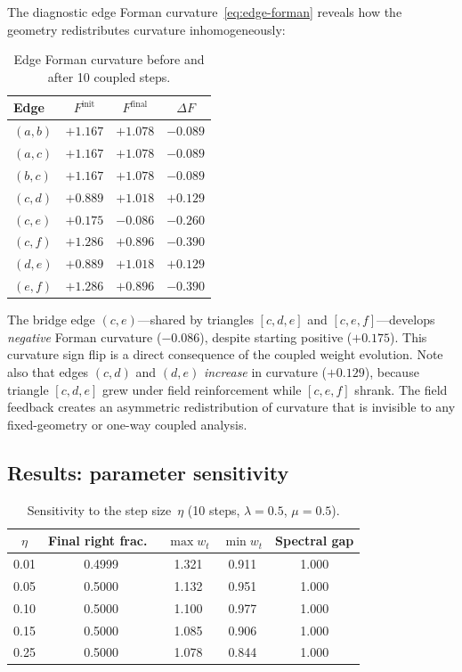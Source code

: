 \documentclass[11pt]{article}
\begin{document}
The diagnostic edge Forman curvature~\eqref{eq:edge-forman} reveals how the geometry redistributes curvature inhomogeneously:

\begin{table}[ht]
\centering
\small
\caption{Edge Forman curvature before and after 10 coupled steps.}
\label{tab:curvature}
\begin{tabular}{lccc}
\toprule
Edge & $F^{\mathrm{init}}$ & $F^{\mathrm{final}}$ & $\Delta F$ \\
\midrule
$(a,b)$ & $+1.167$ & $+1.078$ & $-0.089$ \\
$(a,c)$ & $+1.167$ & $+1.078$ & $-0.089$ \\
$(b,c)$ & $+1.167$ & $+1.078$ & $-0.089$ \\
$(c,d)$ & $+0.889$ & $+1.018$ & $+0.129$ \\
$(c,e)$ & $+0.175$ & $-0.086$ & $-0.260$ \\
$(c,f)$ & $+1.286$ & $+0.896$ & $-0.390$ \\
$(d,e)$ & $+0.889$ & $+1.018$ & $+0.129$ \\
$(e,f)$ & $+1.286$ & $+0.896$ & $-0.390$ \\
\bottomrule
\end{tabular}
\end{table}

The bridge edge $(c,e)$---shared by triangles $[c,d,e]$ and $[c,e,f]$---develops \emph{negative} Forman curvature ($-0.086$), despite starting positive ($+0.175$).  This curvature sign flip is a direct consequence of the coupled weight evolution.  Note also that edges $(c,d)$ and $(d,e)$ \emph{increase} in curvature ($+0.129$), because triangle $[c,d,e]$ grew under field reinforcement while $[c,e,f]$ shrank.  The field feedback creates an asymmetric redistribution of curvature that is invisible to any fixed-geometry or one-way coupled analysis.

\subsection{Results: parameter sensitivity}

\begin{table}[ht]
\centering
\small
\caption{Sensitivity to the step size~$\eta$ (10 steps, $\lambda=0.5$, $\mu=0.5$).}
\label{tab:eta}
\begin{tabular}{ccccc}
\toprule
$\eta$ & Final right frac.\ & $\max w_t$ & $\min w_t$ & Spectral gap \\
\midrule
0.01 & 0.4999 & 1.321 & 0.911 & 1.000 \\
0.05 & 0.5000 & 1.132 & 0.951 & 1.000 \\
0.10 & 0.5000 & 1.100 & 0.977 & 1.000 \\
0.15 & 0.5000 & 1.085 & 0.906 & 1.000 \\
0.25 & 0.5000 & 1.078 & 0.844 & 1.000 \\
\bottomrule
\end{tabular}
\end{table}
\end{document}

